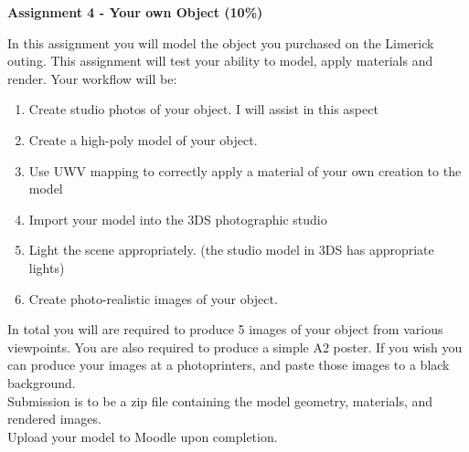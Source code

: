
	
\begin{flushleft}
\Large\textbf{Assignment 4 - Your own Object (10\%)}\\
\end{flushleft}

In this assignment you will model the object you purchased on the Limerick outing.  This assignment will test your ability to model, apply materials and render.  Your workflow will be:
\begin{enumerate}
	\item Create studio photos of your object.  I will assist in this aspect
	\item Create a high-poly model of your object.
	\item Use UWV mapping to correctly apply a material of your own creation to the model
	\item Import your model into the 3DS photographic studio
	\item Light the scene appropriately. (the studio model in 3DS has appropriate lights)
	\item Create photo-realistic images of your object.
\end{enumerate}

In total you will are required to produce 5 images of your object from various viewpoints.  You are also required to produce a simple A2 poster.  If you wish you can produce your images at a photoprinters, and paste those images to a black background.\\

Submission is to be a zip file containing the model geometry, materials, and rendered images.\\

Upload your model to Moodle upon completion.


